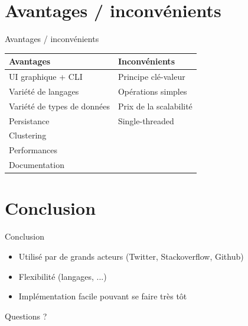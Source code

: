 \documentclass[aspectratio=169]{beamer}
\begin{document}
\section{Avantages / inconvénients}
\begin{frame}{Avantages / inconvénients}
  \begin{center}
     \begin{tabular}{|l|l|}
     \hline
      \textbf{Avantages} & \textbf{Inconvénients} \\
     \hline
     \hline
        UI graphique + CLI & Principe clé-valeur \\
     \hline
     Variété de langages & Opérations simples \\
     \hline
     Variété de types de données & Prix de la scalabilité \\
     \hline
     Persistance & Single-threaded \\
     \hline
     Clustering & \\
     \hline
     Performances & \\
     \hline
     Documentation & \\
     \hline
     \end{tabular}

    \end{center}
\end{frame}

\section{Conclusion}
\begin{frame}{Conclusion}
 \begin{itemize}
  \item Utilisé par de grands acteurs (Twitter, Stackoverflow, Github)
  \item Flexibilité (langages, ...)
  \item Implémentation facile pouvant se faire très tôt
 \end{itemize}
\end{frame}

\begin{frame}{Questions ?}
\end{frame}
\end{document}
